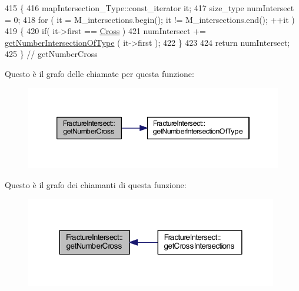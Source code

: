 \begin{DoxyCode}
415 \{
416     mapIntersection\_Type::const\_iterator it;
417     size\_type numIntersect = 0;
418     \textcolor{keywordflow}{for} ( it = M\_intersections.begin(); it != M\_intersections.end(); ++it )
419     \{
420     \textcolor{keywordflow}{if}( it->first == \hyperlink{classFractureIntersect_a9a4e4a784fa4c8e359767ed543f89dc5a743fef1af81c0e61412fafb9438b380e}{Cross} )
421             numIntersect += \hyperlink{classFractureIntersect_a1cd070dda9460d884c1b1d92edfecc12}{getNumberIntersectionOfType} ( it->first );
422     \}
423 
424     \textcolor{keywordflow}{return} numIntersect;
425 \} \textcolor{comment}{// getNumberCross}
\end{DoxyCode}


Questo è il grafo delle chiamate per questa funzione\-:\nopagebreak
\begin{figure}[H]
\begin{center}
\leavevmode
\includegraphics[width=346pt]{classFractureIntersect_a8d9f707319b9b83744b6e03f19003734_cgraph}
\end{center}
\end{figure}




Questo è il grafo dei chiamanti di questa funzione\-:\nopagebreak
\begin{figure}[H]
\begin{center}
\leavevmode
\includegraphics[width=312pt]{classFractureIntersect_a8d9f707319b9b83744b6e03f19003734_icgraph}
\end{center}
\end{figure}


